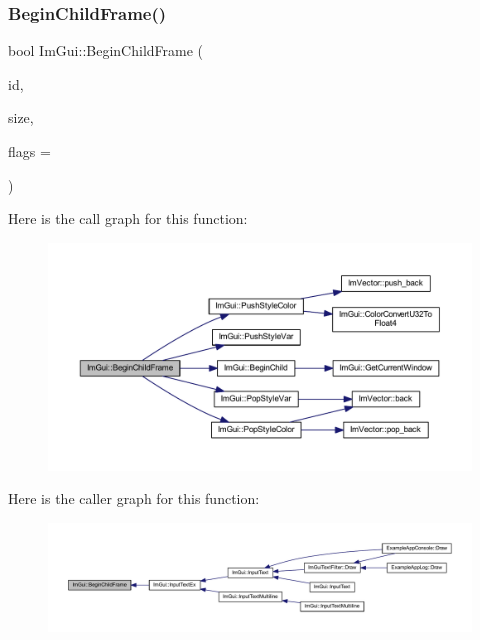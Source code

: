 \mbox{\label{namespace_im_gui_a0565e1ef69c897b1f30f37f95dd787f1}} 
\subsubsection{\texorpdfstring{Begin\+Child\+Frame()}{BeginChildFrame()}}
{\footnotesize\ttfamily bool Im\+Gui\+::\+Begin\+Child\+Frame (\begin{DoxyParamCaption}\item[{\mbox{\hyperlink{imgui_8h_a1785c9b6f4e16406764a85f32582236f}{Im\+Gui\+ID}}}]{id,  }\item[{const \mbox{\hyperlink{struct_im_vec2}{Im\+Vec2}} \&}]{size,  }\item[{\mbox{\hyperlink{imgui_8h_a0b8e067ab4f7a818828c8d89e531addc}{Im\+Gui\+Window\+Flags}}}]{flags = {} }\end{DoxyParamCaption})}

Here is the call graph for this function\+:
\nopagebreak
\begin{figure}[H]
\begin{center}
\leavevmode
\includegraphics[width=350pt]{namespace_im_gui_a0565e1ef69c897b1f30f37f95dd787f1_cgraph}
\end{center}
\end{figure}
Here is the caller graph for this function\+:
\nopagebreak
\begin{figure}[H]
\begin{center}
\leavevmode
\includegraphics[width=350pt]{namespace_im_gui_a0565e1ef69c897b1f30f37f95dd787f1_icgraph}
\end{center}
\end{figure}
\mbox{\label{namespace_im_gui_a6992289cbdb087a690403e48340bfb23}} 
